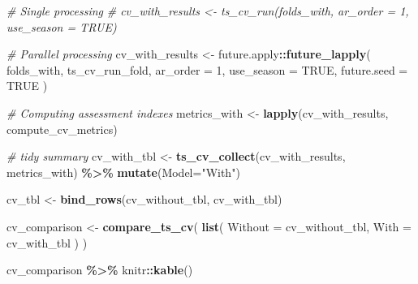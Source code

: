 \documentclass[
]{article}
\newenvironment{Shaded}{\begin{snugshade}}{\end{snugshade}}
\newcommand{\AttributeTok}[1]{\textcolor[rgb]{0.13,0.29,0.53}{#1}}
\newcommand{\CommentTok}[1]{\textcolor[rgb]{0.56,0.35,0.01}{\textit{#1}}}
\newcommand{\ConstantTok}[1]{\textcolor[rgb]{0.56,0.35,0.01}{#1}}
\newcommand{\DecValTok}[1]{\textcolor[rgb]{0.00,0.00,0.81}{#1}}
\newcommand{\FunctionTok}[1]{\textcolor[rgb]{0.13,0.29,0.53}{\textbf{#1}}}
\newcommand{\NormalTok}[1]{#1}
\newcommand{\OtherTok}[1]{\textcolor[rgb]{0.56,0.35,0.01}{#1}}
\newcommand{\SpecialCharTok}[1]{\textcolor[rgb]{0.81,0.36,0.00}{\textbf{#1}}}
\newcommand{\StringTok}[1]{\textcolor[rgb]{0.31,0.60,0.02}{#1}}
\begin{document}
\begin{Shaded}
\begin{Highlighting}[]
\CommentTok{\# Single processing}
\CommentTok{\# cv\_with\_results \textless{}{-} ts\_cv\_run(folds\_with, ar\_order = 1, use\_season = TRUE)}

\CommentTok{\# Parallel processing}
\NormalTok{cv\_with\_results }\OtherTok{\textless{}{-}}\NormalTok{ future.apply}\SpecialCharTok{::}\FunctionTok{future\_lapply}\NormalTok{(}
\NormalTok{  folds\_with,}
\NormalTok{  ts\_cv\_run\_fold,}
  \AttributeTok{ar\_order =} \DecValTok{1}\NormalTok{,}
  \AttributeTok{use\_season =} \ConstantTok{TRUE}\NormalTok{,}
  \AttributeTok{future.seed =} \ConstantTok{TRUE}
\NormalTok{)}

\CommentTok{\# Computing assessment indexes}
\NormalTok{metrics\_with }\OtherTok{\textless{}{-}} \FunctionTok{lapply}\NormalTok{(cv\_with\_results, compute\_cv\_metrics)}

\CommentTok{\# tidy summary}
\NormalTok{cv\_with\_tbl }\OtherTok{\textless{}{-}} \FunctionTok{ts\_cv\_collect}\NormalTok{(cv\_with\_results, metrics\_with) }\SpecialCharTok{\%\textgreater{}\%}
  \FunctionTok{mutate}\NormalTok{(}\AttributeTok{Model=}\StringTok{"With"}\NormalTok{)}


\NormalTok{cv\_tbl }\OtherTok{\textless{}{-}} \FunctionTok{bind\_rows}\NormalTok{(cv\_without\_tbl, cv\_with\_tbl)}

\NormalTok{cv\_comparison }\OtherTok{\textless{}{-}} \FunctionTok{compare\_ts\_cv}\NormalTok{(}
  \FunctionTok{list}\NormalTok{(}
    \AttributeTok{Without =}\NormalTok{ cv\_without\_tbl,}
    \AttributeTok{With =}\NormalTok{ cv\_with\_tbl}
\NormalTok{  )}
\NormalTok{)}

\NormalTok{cv\_comparison }\SpecialCharTok{\%\textgreater{}\%}\NormalTok{ knitr}\SpecialCharTok{::}\FunctionTok{kable}\NormalTok{()}
\end{Highlighting}
\end{Shaded}
\end{document}
